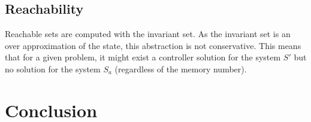 



\subsection{Reachability}
Reachable sets are computed with the invariant set. As the invariant set is an over approximation of the state, this abstraction is not conservative. This means that for a given problem, it might exist a controller solution for the system $S'$ but no solution for the system $S_a$ (regardless of the memory number).

%
%

\section{Conclusion}

